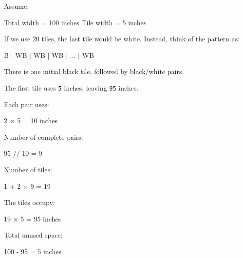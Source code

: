 \documentclass[
]{article}
\newenvironment{Shaded}{\begin{snugshade}}{\end{snugshade}}
\newcommand{\NormalTok}[1]{#1}
\begin{document}
Assume:

\begin{Shaded}
\begin{Highlighting}[]
\NormalTok{Total width = 100 inches}
\NormalTok{Tile width  =   5 inches}
\end{Highlighting}
\end{Shaded}

If we use 20 tiles, the last tile would be white. Instead, think of the
pattern as:

\begin{Shaded}
\begin{Highlighting}[]
\NormalTok{B | WB | WB | WB | ... | WB}
\end{Highlighting}
\end{Shaded}

There is one initial black tile, followed by black/white pairs.

The first tile uses \texttt{5} inches, leaving \texttt{95} inches.

Each pair uses:

\begin{Shaded}
\begin{Highlighting}[]
\NormalTok{2 × 5 = 10 inches}
\end{Highlighting}
\end{Shaded}

Number of complete pairs:

\begin{Shaded}
\begin{Highlighting}[]
\NormalTok{95 // 10 = 9}
\end{Highlighting}
\end{Shaded}

Number of tiles:

\begin{Shaded}
\begin{Highlighting}[]
\NormalTok{1 + 2 × 9 = 19}
\end{Highlighting}
\end{Shaded}

The tiles occupy:

\begin{Shaded}
\begin{Highlighting}[]
\NormalTok{19 × 5 = 95 inches}
\end{Highlighting}
\end{Shaded}

Total unused space:

\begin{Shaded}
\begin{Highlighting}[]
\NormalTok{100 {-} 95 = 5 inches}
\end{Highlighting}
\end{Shaded}
\end{document}
